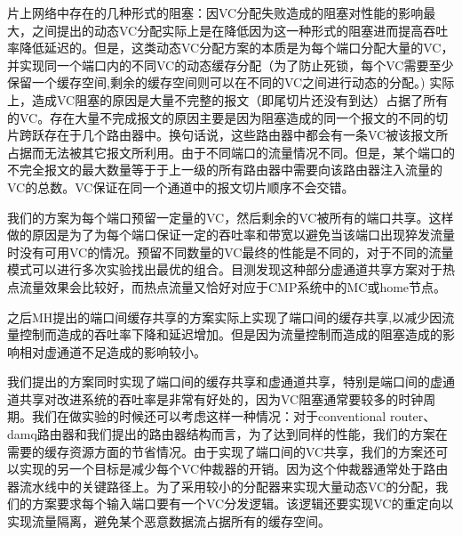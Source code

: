 ﻿\documentclass[10pt,journal]{IEEEtran}
\begin{document}
片上网络中存在的几种形式的阻塞：因VC分配失败造成的阻塞对性能的影响最大，之间提出的动态VC分配实际上是在降低因为这一种形式的阻塞进而提高吞吐率降低延迟的。但是，这类动态VC分配方案的本质是为每个端口分配大量的VC，并实现同一个端口内的不同VC的动态缓存分配（为了防止死锁，每个VC需要至少保留一个缓存空间,剩余的缓存空间则可以在不同的VC之间进行动态的分配。) 实际上，造成VC阻塞的原因是大量不完整的报文（即尾切片还没有到达）占据了所有的VC。存在大量不完成报文的原因主要是因为阻塞造成的同一个报文的不同的切片跨跃存在于几个路由器中。换句话说，这些路由器中都会有一条VC被该报文所占据而无法被其它报文所利用。由于不同端口的流量情况不同。但是，某个端口的不完全报文的最大数量等于于上一级的所有路由器中需要向该路由器注入流量的VC的总数。VC保证在同一个通道中的报文切片顺序不会交错。

我们的方案为每个端口预留一定量的VC，然后剩余的VC被所有的端口共享。这样做的原因是为了为每个端口保证一定的吞吐率和带宽以避免当该端口出现猝发流量时没有可用VC的情况。预留不同数量的VC最终的性能是不同的，对于不同的流量模式可以进行多次实验找出最优的组合。目测发现这种部分虚通道共享方案对于热点流量效果会比较好，而热点流量又恰好对应于CMP系统中的MC或home节点。

之后MH提出的端口间缓存共享的方案实际上实现了端口间的缓存共享,以减少因流量控制而造成的吞吐率下降和延迟增加。但是因为流量控制而造成的阻塞造成的影响相对虚通道不足造成的影响较小。

我们提出的方案同时实现了端口间的缓存共享和虚通道共享，特别是端口间的虚通道共享对改进系统的吞吐率是非常有好处的，因为VC阻塞通常要较多的时钟周期。我们在做实验的时候还可以考虑这样一种情况：对于conventional router、damq路由器和我们提出的路由器结构而言，为了达到同样的性能，我们的方案在需要的缓存资源方面的节省情况。由于实现了端口间的VC共享，我们的方案还可以实现的另一个目标是减少每个VC仲裁器的开销。因为这个仲裁器通常处于路由器流水线中的关键路径上。为了采用较小的分配器来实现大量动态VC的分配，我们的方案要求每个输入端口要有一个VC分发逻辑。该逻辑还要实现VC的重定向以实现流量隔离，避免某个恶意数据流占据所有的缓存空间。
\end{document}
